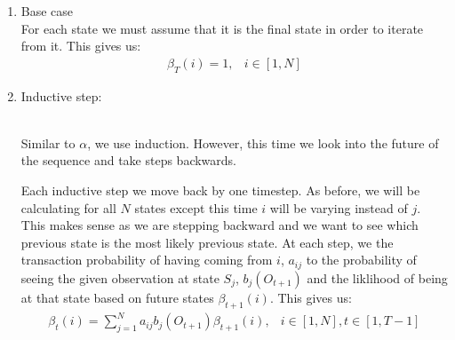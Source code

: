 \begin{enumerate}
    \item Base case \\
    For each state we must assume that it is the final state in order to iterate from it. This gives us:
    \begin{eqnarray}
        \beta_T(i) = 1, & i \in [1,N]
    \end{eqnarray}

    \item Inductive step: \\
    \begin{center}
        \\
        Similar to $\alpha$, we use induction. However, this time we look into the future of the sequence and take steps backwards.
    \end{center}

    Each inductive step we move back by one timestep. As before, we will be calculating for all $N$ states except this time $i$ will be varying instead of $j$. This makes sense as we are stepping backward and we want to see which previous state is the most likely previous state. At each step, we the transaction probability of having coming from $i$, $a_{ij}$ to the probability of seeing the given observation at state $S_j$, $b_j(O_{t+1})$ and the liklihood of being at that state based on future states $\beta_{t+1}(i)$. This gives us:
    \begin{eqnarray}
        \beta_{t}(i) = \sum_{j=1}^N a_{ij} b_j(O_{t+1}) \beta_{t+1}(i), & i \in [1,N], t \in [1,T-1]
    \end{eqnarray}
\end{enumerate}



